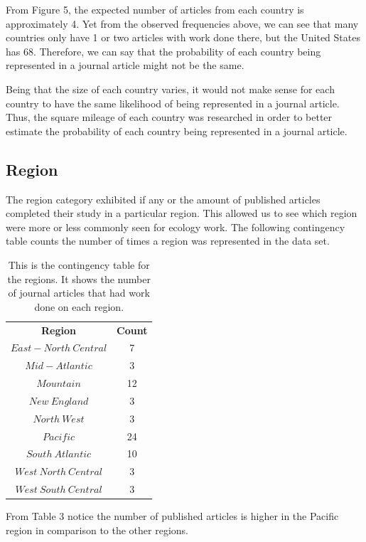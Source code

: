 \documentclass[12pt, letterpaper]{article}
\begin{document}
From Figure 5, the expected number of articles from each country is approximately 4. Yet from the observed frequencies above, we can see that many countries only have 1 or two articles with work done there, but the United States has 68. Therefore, we can say that the probability of each country being represented in a journal article might not be the same.

Being that the size of each country varies, it would not make sense for each country to have the same likelihood of being represented in a journal article. Thus, the square mileage of each country was researched in order to better estimate the probability of each country being represented in a journal article. 

\subsection{Region}
The region category exhibited if any or the amount of published articles completed their study in a particular region. This allowed us to see which region were more or less commonly seen for ecology work. The following contingency table counts the number of times a region was represented in the data set.
\begin{table}[!h]
\begin{center}
\begin{tabular}{|c|c|}
\textbf{Region} & \textbf{Count}\\
$East-North\ Central$ & 7\\
$Mid-Atlantic$ &  3\\
$Mountain$ &  12\\
$New\ England$ & 3\\
$North\ West$ & 3\\
$Pacific$ & 24\\
$South\ Atlantic$ & 10\\
$West\ North\ Central$ & 3\\
$West\ South\ Central$ & 3\\
\end{tabular}
\end{center}
\caption{This is the contingency table for the regions. It shows the number of journal articles that had work done on each region.}
\label{fig: Region Contingency Table}
\end{table}
From Table 3 notice the number of published articles is higher in the Pacific region in comparison to the other regions.
\end{document}
